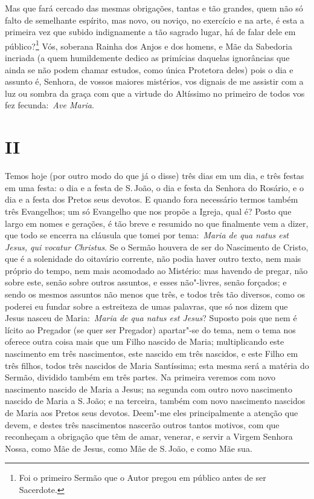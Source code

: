 Mas que fará cercado das mesmas obrigações, tantas e tão
grandes, quem não só falto de semelhante espírito, mas novo, ou noviço,
no exercício e na arte, é esta a primeira vez que subido indignamente a
tão sagrado lugar, há de falar dele em público?\footnote{Foi o primeiro Sermão que o Autor pregou em público antes de ser Sacerdote.} Vós,
soberana Rainha dos Anjos e dos homens, e Mãe da Sabedoria incriada (a
quem humildemente dedico as primícias daquelas ignorâncias que ainda se
não podem chamar estudos, como única Protetora deles) pois o dia e
assunto é, Senhora, de vossos maiores mistérios, vos dignais de me
assistir com a luz ou sombra da graça com que a virtude do Altíssimo no
primeiro de todos vos fez fecunda:~\emph{Ave Maria}.


\section*{II}

Temos hoje (por outro modo do que já o disse) três dias em
um dia, e três festas em uma festa: o dia e a festa de S.\,João, o dia e
festa da Senhora do Rosário, e o dia e a festa dos Pretos seus devotos.
E quando fora necessário termos também três Evangelhos; um só Evangelho
que nos propõe a Igreja, qual é? Posto que largo em nomes e gerações, é
tão breve e resumido no que finalmente vem a dizer, que todo se encerra
na cláusula que tomei por tema:~\emph{Maria de qua natus est Jesus, qui
vocatur Christus}. Se o Sermão houvera de ser do Nascimento de Cristo,
que é a solenidade do oitavário corrente, não podia haver outro texto,
nem mais próprio do tempo, nem mais acomodado ao Mistério: mas havendo
de pregar, não sobre este, senão sobre outros assuntos, e esses
não"-livres, senão forçados; e sendo os mesmos assuntos não menos que
três, e todos três tão diversos, como os poderei eu fundar sobre a
estreiteza de umas palavras, que só nos dizem que Jesus nasceu de
Maria:~\emph{Maria de qua natus est Jesus}? Suposto pois que nem é
lícito ao Pregador (se quer ser Pregador) apartar"-se do tema, nem o tema
nos oferece outra coisa mais que um Filho nascido de Maria;
multiplicando este nascimento em três nascimentos, este nascido em três
nascidos, e este Filho em três filhos, todos três nascidos de Maria
Santíssima; esta mesma será a matéria do Sermão, dividido também em três
partes. Na primeira veremos com novo nascimento nascido de Maria a
Jesus; na segunda com outro novo nascimento nascido de Maria a S.\,João;
e na terceira, também com novo nascimento nascidos de Maria aos Pretos
seus devotos. Deem"-me eles principalmente a atenção que devem, e destes
três nascimentos nascerão outros tantos motivos, com que reconheçam a
obrigação que têm de amar, venerar, e servir a Virgem Senhora Nossa,
como Mãe de Jesus, como Mãe de S.\,João, e como Mãe sua.


